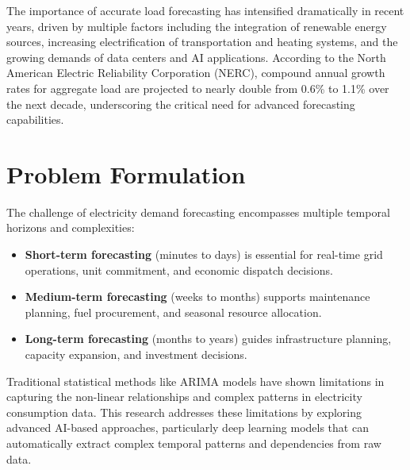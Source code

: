 \documentclass[12pt,a4paper]{report}
\begin{document}
The importance of accurate load forecasting has intensified dramatically in recent years, driven by multiple factors including the integration of renewable energy sources, increasing electrification of transportation and heating systems, and the growing demands of data centers and AI applications. According to the North American Electric Reliability Corporation (NERC), compound annual growth rates for aggregate load are projected to nearly double from 0.6\% to 1.1\% over the next decade, underscoring the critical need for advanced forecasting capabilities.


\section{Problem Formulation}
The challenge of electricity demand forecasting encompasses multiple temporal horizons and complexities:

\begin{itemize}
\item \textbf{Short-term forecasting} (minutes to days) is essential for real-time grid operations, unit commitment, and economic dispatch decisions.
\item \textbf{Medium-term forecasting} (weeks to months) supports maintenance planning, fuel procurement, and seasonal resource allocation.
\item \textbf{Long-term forecasting} (months to years) guides infrastructure planning, capacity expansion, and investment decisions.
\end{itemize}

Traditional statistical methods like ARIMA models have shown limitations in capturing the non-linear relationships and complex patterns in electricity consumption data. This research addresses these limitations by exploring advanced AI-based approaches, particularly deep learning models that can automatically extract complex temporal patterns and dependencies from raw data.
\end{document}

